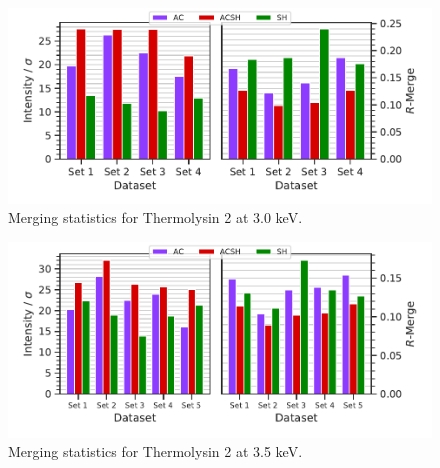 
\begin{figure}
    \centering
    \includegraphics{plots/exp1/tlys_2_P6122/3p0_stats_grid.pdf}
    \caption{Merging statistics for Thermolysin 2 at 3.0 \unit{keV}.}
    \label{fig:tlys_2_3p0}
\end{figure}

\begin{figure}
    \centering
    \includegraphics{plots/exp1/tlys_2_P6122/3p5_stats_grid.pdf}
    \caption{Merging statistics for Thermolysin 2 at 3.5 \unit{keV}.}
    \label{fig:tlys_2_3p5}
\end{figure}


